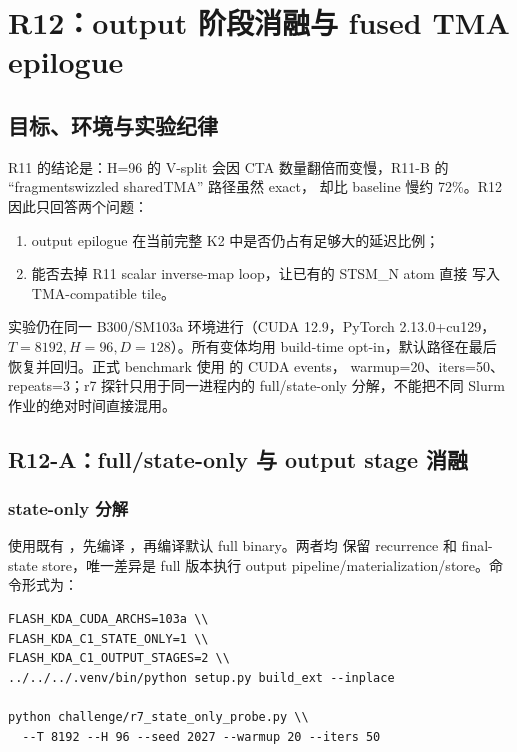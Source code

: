 \section{R12：output 阶段消融与 fused TMA epilogue}

\subsection{目标、环境与实验纪律}

R11 的结论是：H=96 的 V-split 会因 CTA 数量翻倍而变慢，R11-B 的
``fragment\textrightarrow{}swizzled shared\textrightarrow{}TMA'' 路径虽然 exact，
却比 baseline 慢约 72\%。R12 因此只回答两个问题：

\begin{enumerate}
  \item output epilogue 在当前完整 K2 中是否仍占有足够大的延迟比例；
  \item 能否去掉 R11 scalar inverse-map loop，让已有的 STSM\_N atom 直接
        写入 TMA-compatible tile。
\end{enumerate}

实验仍在同一 B300/SM103a 环境进行（CUDA 12.9，PyTorch 2.13.0+cu129，
\(T=8192,H=96,D=128\)）。所有变体均用 build-time opt-in，默认路径在最后
恢复并回归。正式 benchmark 使用  的 CUDA events，
warmup=20、iters=50、repeats=3；r7 探针只用于同一进程内的 full/state-only
分解，不能把不同 Slurm 作业的绝对时间直接混用。

\subsection{R12-A：full/state-only 与 output stage 消融}

\subsubsection{state-only 分解}

使用既有 ，先编译
，再编译默认 full binary。两者均
保留 recurrence 和 final-state store，唯一差异是 full 版本执行 output
pipeline/materialization/store。命令形式为：

\begin{lstlisting}
FLASH_KDA_CUDA_ARCHS=103a \\
FLASH_KDA_C1_STATE_ONLY=1 \\
FLASH_KDA_C1_OUTPUT_STAGES=2 \\
../../../.venv/bin/python setup.py build_ext --inplace

python challenge/r7_state_only_probe.py \\
  --T 8192 --H 96 --seed 2027 --warmup 20 --iters 50
\end{lstlisting}

